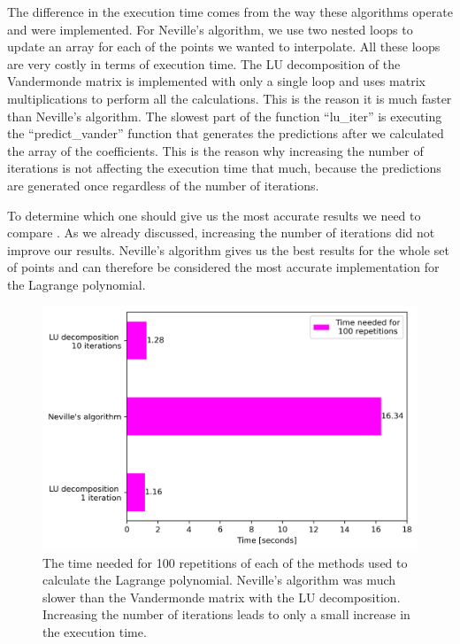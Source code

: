 \documentclass[a4paper,10pt]{article}
\begin{document}
The difference in the execution time comes from the way these algorithms operate and were implemented. For Neville's algorithm, we use two nested loops to update an array for each of the points we wanted to interpolate. All these loops are very costly in terms of execution time. The LU decomposition of the Vandermonde matrix is implemented with only a single loop and uses matrix multiplications to perform all the calculations. This is the reason it is much faster than Neville's algorithm. The slowest part of the function ``lu\_iter'' is executing the ``predict\_vander'' function that generates the predictions after we calculated the array of the coefficients. This is the reason why increasing the number of iterations is not affecting the execution time that much, because the predictions are generated once regardless of the number of iterations.

To determine which one should give us the most accurate results we need to compare . As we already discussed, increasing the number of iterations did not improve our results. Neville's algorithm gives us the best results for the whole set of points and can therefore be considered the most accurate implementation for the Lagrange polynomial. 

\begin{figure}[H]
  \centering
  \includegraphics[width=0.75\linewidth]{./plots/time.png}
  \caption{ The time needed for 100 repetitions of each of the methods used to calculate the Lagrange polynomial. Neville's algorithm was much slower than the Vandermonde matrix with the LU decomposition. Increasing the number of iterations leads to only a small increase in the execution time.  }
  \label{fig:time}
\end{figure}
\end{document}
